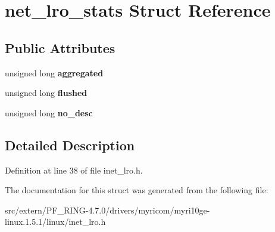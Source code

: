 \hypertarget{structnet__lro__stats}{
\section{net\_\-lro\_\-stats Struct Reference}
\label{structnet__lro__stats}
}
\subsection*{Public Attributes}
\begin{DoxyCompactItemize}
\item 
\hypertarget{structnet__lro__stats_a9504188c124cfeb1bc56d606279c8cd0}{
unsigned long {\bfseries aggregated}}
\label{structnet__lro__stats_a9504188c124cfeb1bc56d606279c8cd0}

\item 
\hypertarget{structnet__lro__stats_a7b8dbf6aa0aad086f9b444099bad1435}{
unsigned long {\bfseries flushed}}
\label{structnet__lro__stats_a7b8dbf6aa0aad086f9b444099bad1435}

\item 
\hypertarget{structnet__lro__stats_a343f3db869de44041cea6d8c7f5f367d}{
unsigned long {\bfseries no\_\-desc}}
\label{structnet__lro__stats_a343f3db869de44041cea6d8c7f5f367d}

\end{DoxyCompactItemize}


\subsection{Detailed Description}


Definition at line 38 of file inet\_\-lro.h.



The documentation for this struct was generated from the following file:\begin{DoxyCompactItemize}
\item 
src/extern/PF\_\-RING-\/4.7.0/drivers/myricom/myri10ge-\/linux.1.5.1/linux/inet\_\-lro.h\end{DoxyCompactItemize}
